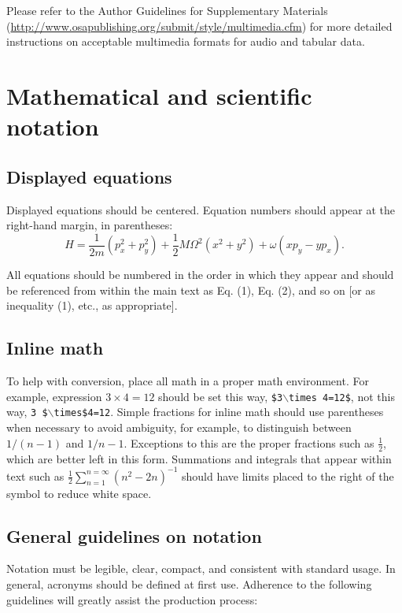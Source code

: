 \documentclass[10pt,letterpaper]{article}
\begin{document}
Please refer to the Author Guidelines for Supplementary Materials (\mbox{\url{http://www.osapublishing.org/submit/style/multimedia.cfm}}) for more detailed instructions on acceptable multimedia formats for audio and tabular data.


\section{Mathematical and scientific notation}

\subsection{Displayed equations} Displayed equations should be centered.
Equation numbers should appear at the right-hand margin, in
parentheses:
\begin{equation}
H = \frac{1}{2m}(p_x^2 + p_y^2) + \frac{1}{2} M{\Omega}^2
     (x^2 + y^2) + \omega (x p_y - y p_x).
\end{equation}

All equations should be numbered in the order in which they appear
and should be referenced  from within the main text as Eq. (1),
Eq. (2), and so on [or as inequality (1), etc., as appropriate].

\subsection{Inline math} To help with conversion, place all math in a proper math environment. For example, expression \mbox{$3\times 4 = 12$} should be set this way, \texttt{\$3$\backslash$times 4=12\$}, not this way, \texttt{3 \$$\backslash$times\$4=12}. Simple fractions for inline math
should use parentheses when necessary to avoid ambiguity, for
example, to distinguish between $1/(n-1)$ and $1/n-1$.  Exceptions
to this are the proper fractions such as $\frac{1}{2}$, which are
better left in this form. Summations and integrals that appear
within text such as $\frac{1}{2}{\sum }_{n=1}^{n=\infty} (n^2 -
2n)^{-1}$ should have limits placed to the right of the symbol to
reduce white space.

\subsection{General guidelines on notation} Notation must be
legible, clear, compact, and consistent with standard usage. In
general, acronyms should be defined at first use. Adherence to the
following guidelines will greatly assist the production process:
\end{document}
